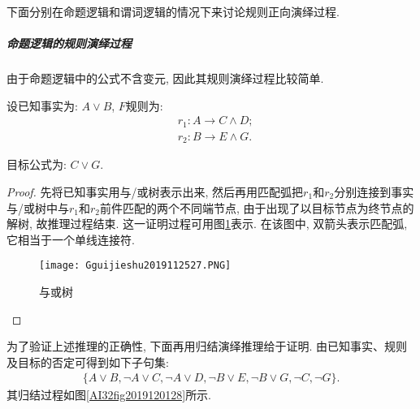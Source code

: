 下面分别在命题逻辑和谓词逻辑的情况下来讨论规则正向演绎过程.
\subparagraph{命题逻辑的规则演绎过程}
由于命题逻辑中的公式不含变元, 因此其规则演绎过程比较简单.
\begin{example}
设已知事实为: $A\vee B$, $F$规则为:
\begin{align}
    &r_1:  A\rightarrow C\wedge D;\\
    &r_2:  B\rightarrow E\wedge G.
\end{align}

目标公式为: $C\vee G$.
\end{example}
\begin{proof}
先将已知事实用与/或树表示出来, 然后再用匹配弧把$r_1$和$r_2$分别连接到事实与/或树中与$r_1$和$r_2$前件匹配的两个不同端节点, 由于出现了以目标节点为终节点的解树, 故推理过程结束. 这一证明过程可用图\ref{AI32fig2019120127}表示.
在该图中, 双箭头表示匹配弧, 它相当于一个单线连接符.
\begin{figure}[H]
\centering
\texttt{[image: Gguijieshu2019112527.PNG]}
\caption{与或树}
\label{AI32fig2019120127}
\end{figure}
\end{proof}
为了验证上述推理的正确性, 下面再用归结演绎推理给于证明. 由已知事实、规则及目标的否定可得到如下子句集:
\begin{align}
  \{A\vee B, \neg A\vee C, \neg A\vee D, \neg B\vee E, \neg B\vee G, \neg C, \neg G\}.
\end{align}
其归结过程如图\ref{AI32fig2019120128}所示.
